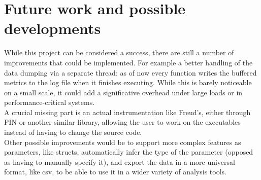 	\section{Future work and possible developments}

        While this project can be considered a success, there are still a number of improvements
        that could be implemented. For example a better handling of the data dumping via a separate thread:
        as of now every function writes the buffered metrics to the log file when it finishes executing. While this
        is barely noticeable on a small scale, it could add a significative overhead under large loads
        or in performance-critical systems.\\

        A crucial missing part is an actual instrumentation like Freud's, either through PIN or another
        similar library, allowing the user to work on the executables instead of having to change the source code.\\

        Other possible improvements would be to support more complex features as parameters, like structs,
        automatically infer the type of the parameter (opposed as having to manually specify it), and
        export the data in a more universal format, like csv, to be able to use it in a wider variety of
        analysis tools.
